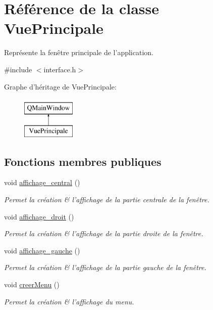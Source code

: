 \hypertarget{class_vue_principale}{\section{Référence de la classe Vue\-Principale}
\label{class_vue_principale}
}


Représente la fenêtre principale de l'application.  




{\ttfamily \#include $<$interface.\-h$>$}

Graphe d'héritage de Vue\-Principale\-:\begin{figure}[H]
\begin{center}
\leavevmode
\includegraphics[height=2.000000cm]{class_vue_principale}
\end{center}
\end{figure}
\subsection*{Fonctions membres publiques}
\begin{DoxyCompactItemize}
\item 
void \hyperlink{class_vue_principale_a38a2850977156eaee637de1be6b9991a}{affichage\-\_\-central} ()
\begin{DoxyCompactList}\small\item\em Permet la création \& l'affichage de la partie centrale de la fenêtre. \end{DoxyCompactList}\item 
void \hyperlink{class_vue_principale_a2ed333250733915a381e15042df3bd35}{affichage\-\_\-droit} ()
\begin{DoxyCompactList}\small\item\em Permet la création \& l'affichage de la partie droite de la fenêtre. \end{DoxyCompactList}\item 
void \hyperlink{class_vue_principale_ab85635081670f7072008344d28b5b603}{affichage\-\_\-gauche} ()
\begin{DoxyCompactList}\small\item\em Permet la création \& l'affichage de la partie gauche de la fenêtre. \end{DoxyCompactList}\item 
void \hyperlink{class_vue_principale_ae06449e378e3a1426bd81a0d00447c8b}{creer\-Menu} ()
\begin{DoxyCompactList}\small\item\em Permet la création \& l'affichage du menu. \end{DoxyCompactList}\end{DoxyCompactItemize}
